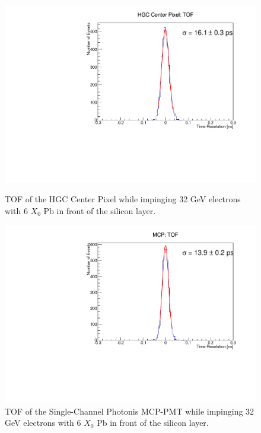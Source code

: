 \documentclass[twocolumn,aps,prd,reprint,superscriptaddress,floatfix]{revtex4-1}
\begin{document}
\begin{figure}[!htb]
\centering
\begin{minipage}[t]{\linewidth}
	\centering
	\includegraphics[width=\textwidth]{deltaTCenter.pdf}
	\caption{TOF of the HGC Center Pixel while impinging 32 GeV electrons with 6 $X_0$ Pb in front of the silicon layer.}
	\label{fig:Center}
\end{minipage} \hfill
\newline
\newline
\begin{minipage}[t]{\linewidth}
	\centering
	\includegraphics[width=\textwidth]{deltaTMCP.pdf}
	\caption{TOF of the Single-Channel Photonis MCP-PMT while impinging 32 GeV electrons with 6 $X_0$ Pb in front of the silicon layer.}
	\label{fig:MCP}
\end{minipage}
\end{figure}
\end{document}
